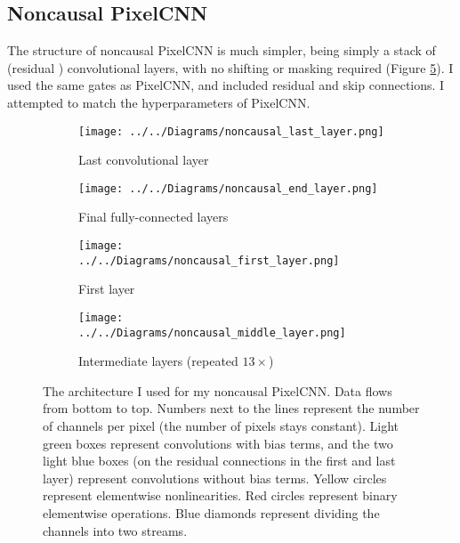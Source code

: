 \documentclass[11pt, a4paper]{book}
\begin{document}
\subsection{Noncausal PixelCNN}

The structure of noncausal PixelCNN is much simpler, being simply a stack of (residual \citep{resnet}) convolutional layers, with no shifting or masking required (Figure \ref{noncausal}). I used the same gates as PixelCNN, and included residual and skip connections. I attempted to match the hyperparameters of PixelCNN.

\begin{figure}
  \centering
    \begin{subfigure}{0.35\columnwidth}
    	\addtocounter{subfigure}{2}
        \centering
        \caption{Last convolutional layer}
        \texttt{[image: ../../Diagrams/noncausal\_last\_layer.png]} 
        \label{noncausal:last}
    \end{subfigure}
    \hfill
    \begin{subfigure}{0.45\columnwidth}
        \centering
        \caption{Final fully-connected layers}
        \texttt{[image: ../../Diagrams/noncausal\_end\_layer.png]} 
        \label{noncausal:end}
    \end{subfigure}
    \vspace{1cm}
    \addtocounter{subfigure}{-4}
    \begin{subfigure}{0.35\columnwidth}
        \centering
        \caption{First layer}
        \texttt{[image: ../../Diagrams/noncausal\_first\_layer.png]} 
        \label{noncausal:first}
    \end{subfigure}
    \hfill
    \begin{subfigure}{0.35\columnwidth}
        \centering
        \caption{Intermediate layers (repeated $13\times$)}
        \texttt{[image: ../../Diagrams/noncausal\_middle\_layer.png]} 
        \label{noncausal:middle}
    \end{subfigure}
  \caption[Architecture of noncausal PixelCNN]{The architecture I used for my noncausal PixelCNN. Data flows from bottom to top. Numbers next to the lines represent the number of channels per pixel (the number of pixels stays constant). Light green boxes represent convolutions with bias terms, and the two light blue boxes (on the residual connections in the first and last layer) represent convolutions without bias terms. Yellow circles represent elementwise nonlinearities. Red circles represent binary elementwise operations. Blue diamonds represent dividing the channels into two streams.}
  \label{noncausal}
\end{figure}
\end{document}
